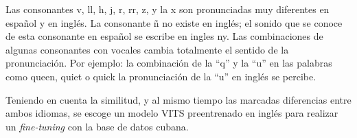 Las consonantes v, ll, h, j, r, rr, z, y  la x son pronunciadas muy diferentes en español y en inglés. La consonante ñ no existe en inglés; el sonido que se conoce de esta consonante en español se escribe en ingles ny. Las combinaciones de algunas consonantes con vocales cambia totalmente el sentido de la pronunciación. Por ejemplo: la combinación de la “q” y la “u” en las palabras como queen, quiet o quick la pronunciación de  la “u” en inglés se percibe.

Teniendo en cuenta la similitud, y al mismo tiempo las marcadas diferencias entre ambos idiomas, se escoge un modelo VITS preentrenado en inglés para realizar un \textit{fine-tuning} con la base de datos cubana.
